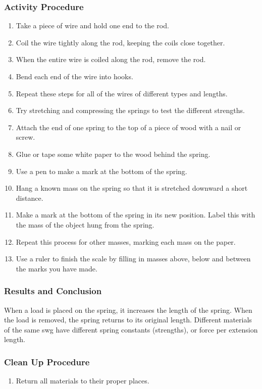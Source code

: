 \subsubsection*{Activity Procedure}
\begin{enumerate}
\item{Take a piece of wire and hold one end to the rod.}
\item{Coil the wire tightly along the rod, keeping the coils close together.}
\item{When the entire wire is coiled along the rod, remove the rod.}
\item{Bend each end of the wire into hooks.}
\item{Repeat these steps for all of the wires of different types and lengths.}
\item{Try stretching and compressing the springs to test the different strengths.}
\item{Attach the end of one spring to the top of a piece of wood with a nail or screw.}
\item{Glue or tape some white paper to the wood behind the spring.}
\item{Use a pen to make a mark at the bottom of the spring.}
\item{Hang a known mass on the spring so that it is stretched downward a short distance.}
\item{Make a mark at the bottom of the spring in its new position.  Label this with the mass of the object hung from the spring.}
\item{Repeat this process for other masses, marking each mass on the paper.}
\item{Use a ruler to finish the scale by filling in masses above, below and between the marks you have made.}
\end{enumerate}

\subsubsection*{Results and Conclusion}
When a load is placed on the spring, it increases the length of the spring.  When the load is removed, the spring returns to its original length.
Different materials of the same swg have different spring constants (strengths), or force per extension length.

\subsubsection*{Clean Up Procedure}
\begin{enumerate}
\item{Return all materials to their proper places.}
\end{enumerate}

